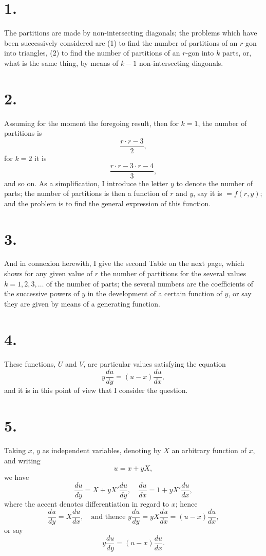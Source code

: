 \documentclass[11pt,a4paper]{book}
\begin{document}
\section*{1.}
The partitions are made by non-intersecting diagonals; the problems which have been successively considered are (1) to find the number of partitions of an $r$-gon into triangles, (2) to find the number of partitions of an $r$-gon into $k$ parts, or, what is the same thing, by means of $k - 1$ non-intersecting diagonals.

\section*{2.}
Assuming for the moment the foregoing result, then for $k=1$, the number of partitions is
\[
\frac{r \cdot r - 3}{2},
\]
for $k = 2$ it is
\[
\frac{r \cdot r - 3 \cdot r - 4}{3},
\]
and so on. As a simplification, I introduce the letter $y$ to denote the number of parts; the number of partitions is then a function of $r$ and $y$, say it is $= f(r, y)$; and the problem is to find the general expression of this function.

\section*{3.}
And in connexion herewith, I give the second Table on the next page, which shows for any given value of $r$ the number of partitions for the several values $k = 1, 2, 3, \ldots$ of the number of parts; the several numbers are the coefficients of the successive powers of $y$ in the development of a certain function of $y$, or say they are given by means of a generating function.

\section*{4.}
These functions, $U$ and $V$, are particular values satisfying the equation
\[
y\frac{du}{dy} = (u - x)\frac{du}{dx},
\]
and it is in this point of view that I consider the question.

\section*{5.}
Taking $x$, $y$ as independent variables, denoting by $X$ an arbitrary function of $x$, and writing
\[
u = x + yX,
\]
we have
\[
\frac{du}{dy} = X + yX'\frac{du}{dy}, \quad \frac{du}{dx} = 1 + yX'\frac{du}{dx},
\]
where the accent denotes differentiation in regard to $x$; hence
\[
\frac{du}{dy} = X\frac{du}{dx}, \quad \text{and thence } y\frac{du}{dy} = yX\frac{du}{dx} = (u - x)\frac{du}{dx},
\]
or say
\[
y\frac{du}{dy} = (u - x)\frac{du}{dx}.
\]
\end{document}
